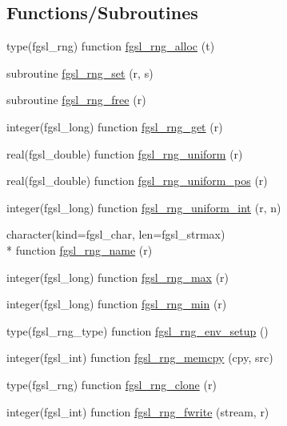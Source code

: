 \subsection*{Functions/\-Subroutines}
\begin{DoxyCompactItemize}
\item 
type(fgsl\-\_\-rng) function \hyperlink{rng_8finc_a30f2372e956b9bd66f43de5c6de060d9}{fgsl\-\_\-rng\-\_\-alloc} (t)
\item 
subroutine \hyperlink{rng_8finc_a4bff01c18fd9fbf639fd6d8e75c9e85a}{fgsl\-\_\-rng\-\_\-set} (r, s)
\item 
subroutine \hyperlink{rng_8finc_af0801f3c2ac80076ea94f4b0393665a0}{fgsl\-\_\-rng\-\_\-free} (r)
\item 
integer(fgsl\-\_\-long) function \hyperlink{rng_8finc_a437565a21cf12f8aa87eec1ec36ff143}{fgsl\-\_\-rng\-\_\-get} (r)
\item 
real(fgsl\-\_\-double) function \hyperlink{rng_8finc_aa854677900243f9feabf49ee137e38b9}{fgsl\-\_\-rng\-\_\-uniform} (r)
\item 
real(fgsl\-\_\-double) function \hyperlink{rng_8finc_a787ed01d91454a49a28d4344d35559cf}{fgsl\-\_\-rng\-\_\-uniform\-\_\-pos} (r)
\item 
integer(fgsl\-\_\-long) function \hyperlink{rng_8finc_ae0ce08aee233600b619e3ddc2bcb0ef2}{fgsl\-\_\-rng\-\_\-uniform\-\_\-int} (r, n)
\item 
character(kind=fgsl\-\_\-char, len=fgsl\-\_\-strmax) \\*
function \hyperlink{rng_8finc_a54c05ff204ef98053bf5124603d2b334}{fgsl\-\_\-rng\-\_\-name} (r)
\item 
integer(fgsl\-\_\-long) function \hyperlink{rng_8finc_afa55230f7211ea98414429229b64a8c4}{fgsl\-\_\-rng\-\_\-max} (r)
\item 
integer(fgsl\-\_\-long) function \hyperlink{rng_8finc_a61f73ec296fa294c6b0634533d537d01}{fgsl\-\_\-rng\-\_\-min} (r)
\item 
type(fgsl\-\_\-rng\-\_\-type) function \hyperlink{rng_8finc_a398d0b93637d4cd2f0ec42aa9d704fed}{fgsl\-\_\-rng\-\_\-env\-\_\-setup} ()
\item 
integer(fgsl\-\_\-int) function \hyperlink{rng_8finc_a3b20f59958b9d1f96e11c91deb33eebb}{fgsl\-\_\-rng\-\_\-memcpy} (cpy, src)
\item 
type(fgsl\-\_\-rng) function \hyperlink{rng_8finc_acc66804b594701e03a27cea42373fac6}{fgsl\-\_\-rng\-\_\-clone} (r)
\item 
integer(fgsl\-\_\-int) function \hyperlink{rng_8finc_ad9f602fa3c592fdac3659a1746143aa1}{fgsl\-\_\-rng\-\_\-fwrite} (stream, r)

\end{DoxyCompactItemize}
